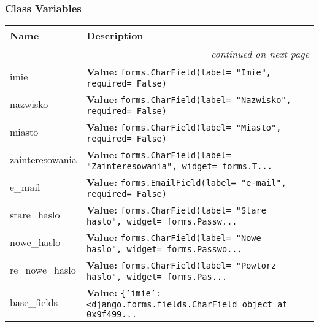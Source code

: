  \subsubsection{Class Variables}

    \vspace{-1cm}
\hspace{\varindent}\begin{longtable}{|p{\varnamewidth}|p{\vardescrwidth}|l}
\cline{1-2}
\cline{1-2} \centering \textbf{Name} & \centering \textbf{Description}& \\
\cline{1-2}
\endhead\cline{1-2}\multicolumn{3}{r}{\small\textit{continued on next page}}\\\endfoot\cline{1-2}
\endlastfoot\raggedright i\-m\-i\-e\- & \raggedright \textbf{Value:} 
{\tt forms.CharField(label= "Imie", required= False)}&\\
\cline{1-2}
\raggedright n\-a\-z\-w\-i\-s\-k\-o\- & \raggedright \textbf{Value:} 
{\tt forms.CharField(label= "Nazwisko", required= False)}&\\
\cline{1-2}
\raggedright m\-i\-a\-s\-t\-o\- & \raggedright \textbf{Value:} 
{\tt forms.CharField(label= "Miasto", required= False)}&\\
\cline{1-2}
\raggedright z\-a\-i\-n\-t\-e\-r\-e\-s\-o\-w\-a\-n\-i\-a\- & \raggedright \textbf{Value:} 
{\tt forms.CharField(label= "Zainteresowania", widget= forms.T\texttt{...}}&\\
\cline{1-2}
\raggedright e\-\_\-m\-a\-i\-l\- & \raggedright \textbf{Value:} 
{\tt forms.EmailField(label= "e-mail", required= False)}&\\
\cline{1-2}
\raggedright s\-t\-a\-r\-e\-\_\-h\-a\-s\-l\-o\- & \raggedright \textbf{Value:} 
{\tt forms.CharField(label= "Stare haslo", widget= forms.Passw\texttt{...}}&\\
\cline{1-2}
\raggedright n\-o\-w\-e\-\_\-h\-a\-s\-l\-o\- & \raggedright \textbf{Value:} 
{\tt forms.CharField(label= "Nowe haslo", widget= forms.Passwo\texttt{...}}&\\
\cline{1-2}
\raggedright r\-e\-\_\-n\-o\-w\-e\-\_\-h\-a\-s\-l\-o\- & \raggedright \textbf{Value:} 
{\tt forms.CharField(label= "Powtorz haslo", widget= forms.Pas\texttt{...}}&\\
\cline{1-2}
\raggedright b\-a\-s\-e\-\_\-f\-i\-e\-l\-d\-s\- & \raggedright \textbf{Value:} 
{\tt \{'imie': {\textless}django.forms.fields.CharField object at 0x9f499\texttt{...}}&\\
\cline{1-2}
\end{longtable}

